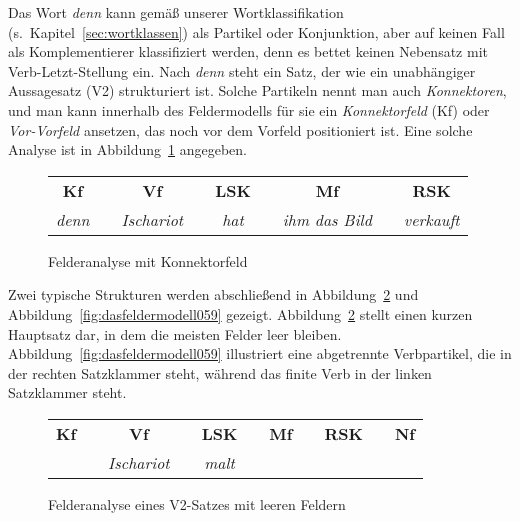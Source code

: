 
Das Wort \textit{denn} kann gemäß unserer Wortklassifikation (s.\ Kapitel~\ref{sec:wortklassen}) als Partikel oder Konjunktion, aber auf keinen Fall als Komplementierer klassifiziert werden, denn es bettet keinen Nebensatz mit Verb-Letzt-Stellung ein.
Nach \textit{denn} steht ein Satz, der wie ein unabhängiger Aussagesatz (V2) strukturiert ist.
Solche Partikeln nennt man auch \textit{Konnektoren}, und man kann innerhalb des Feldermodells für sie ein \textit{Konnektorfeld} (Kf) oder \textit{Vor-Vorfeld} ansetzen, das noch vor dem Vorfeld positioniert ist.
Eine solche Analyse ist in Abbildung~\ref{fig:dasfeldermodell057} angegeben.

\begin{figure}[!htbp]
  \centering
  \begin{tabular}{cp{0.1em}cp{0.1em}cp{0.1em}cp{0.1em}c}
    \textbf{Kf} && \textbf{Vf} && \textbf{LSK} && \textbf{Mf} && \textbf{RSK} \\
    \cmidrule{1-1}\cmidrule{3-3}\cmidrule{5-5}\cmidrule{7-7}\cmidrule{9-9}
    \textit{denn} && \textit{Ischariot} && \textit{hat} && \textit{ihm das Bild} && \textit{verkauft} \\
  \end{tabular}
  \caption{Felderanalyse mit Konnektorfeld}
  \label{fig:dasfeldermodell057}
\end{figure}

Zwei typische Strukturen werden abschließend in Abbildung~\ref{fig:dasfeldermodell058} und Abbildung~\ref{fig:dasfeldermodell059} gezeigt.
Abbildung~\ref{fig:dasfeldermodell058} stellt einen kurzen Hauptsatz dar, in dem die meisten Felder leer bleiben.
Abbildung~\ref{fig:dasfeldermodell059} illustriert eine abgetrennte Verbpartikel, die in der rechten Satzklammer steht, während das finite Verb in der linken Satzklammer steht.

\begin{figure}[!htbp]
  \centering
  \begin{tabular}{cp{0.1em}cp{0.1em}cp{0.1em}cp{0.1em}cp{0.1em}c}
    \textbf{Kf} && \textbf{Vf} && \textbf{LSK} && \textbf{Mf} && \textbf{RSK} && \textbf{Nf} \\
    \cmidrule{1-1}\cmidrule{3-3}\cmidrule{5-5}\cmidrule{7-7}\cmidrule{9-9}\cmidrule{11-11}
    && \textit{Ischariot} && \textit{malt} &&&&&& \\
  \end{tabular}
  \caption{Felderanalyse eines V2-Satzes mit leeren Feldern}
  \label{fig:dasfeldermodell058}
\end{figure}

